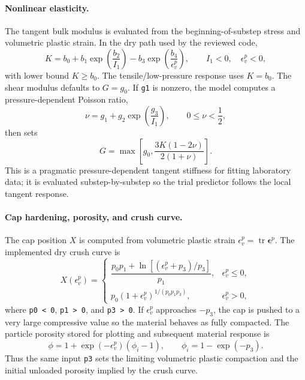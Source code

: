 \paragraph{Nonlinear elasticity.}
The tangent bulk modulus is evaluated from the beginning-of-substep stress and volumetric plastic strain.  In the dry path used by the reviewed code,
\begin{equation}
  K = b_0 + b_1\exp\left(\frac{b_2}{I_1}\right) - b_3\exp\left(\frac{b_4}{\epsilon_v^p}\right),
  \qquad I_1<0, \quad \epsilon_v^p<0,
  \label{eq:geomechanics-bulk-modulus}
\end{equation}
with lower bound \(K\ge b_0\).  The tensile/low-pressure response uses \(K=b_0\).  The shear modulus defaults to \(G=g_0\).  If \texttt{g1} is nonzero, the model computes a pressure-dependent Poisson ratio,
\begin{equation}
  \nu = g_1 + g_2\exp\left(\frac{g_3}{I_1}\right), \qquad 0\le \nu < \frac{1}{2},
  \label{eq:geomechanics-poisson}
\end{equation}
then sets
\begin{equation}
  G = \max\left[g_0,\frac{3K(1-2\nu)}{2(1+\nu)}\right].
  \label{eq:geomechanics-shear-modulus}
\end{equation}
This is a pragmatic pressure-dependent tangent stiffness for fitting laboratory data; it is evaluated substep-by-substep so the trial predictor follows the local tangent response.

\paragraph{Cap hardening, porosity, and crush curve.}
The cap position \(X\) is computed from volumetric plastic strain \(\epsilon_v^p=\operatorname{tr}\boldsymbol{\epsilon}^p\).  The implemented dry crush curve is
\begin{equation}
  X(\epsilon_v^p)=
  \begin{cases}
    \dfrac{p_0p_1+\ln\left[(\epsilon_v^p+p_3)/p_3\right]}{p_1}, & \epsilon_v^p\le 0,\\[0.8em]
    p_0(1+\epsilon_v^p)^{1/(p_0p_1p_3)}, & \epsilon_v^p>0,
  \end{cases}
  \label{eq:geomechanics-crush-curve}
\end{equation}
where \texttt{p0 < 0}, \texttt{p1 > 0}, and \texttt{p3 > 0}.  If \(\epsilon_v^p\) approaches \(-p_3\), the cap is pushed to a very large compressive value so the material behaves as fully compacted.  The particle porosity stored for plotting and subsequent material response is
\begin{equation}
  \phi = 1 + \exp(-\epsilon_v^p)(\phi_i-1),
  \qquad
  \phi_i = 1-\exp(-p_3).
  \label{eq:geomechanics-porosity}
\end{equation}
Thus the same input \texttt{p3} sets the limiting volumetric plastic compaction and the initial unloaded porosity implied by the crush curve.

